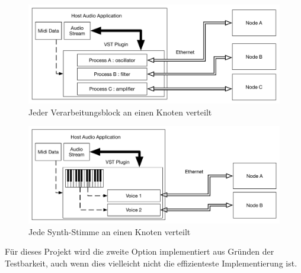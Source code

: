 \begin{figure}[H]
    \centering
    \includegraphics[width=\textwidth]{assets/distribution_perprocessor.pdf}
    \caption{Jeder Verarbeitungsblock an einen Knoten verteilt}
    \label{fig:perproccessor}
\end{figure}

\begin{figure}[H]
    \centering
    \includegraphics[width=\textwidth]{assets/distribute_byvoice.pdf}
    \caption{Jede Synth-Stimme an einen Knoten verteilt}
    \label{fig:pervoice}
\end{figure}

Für dieses Projekt wird die zweite Option implementiert aus  Gründen der Testbarkeit, auch wenn dies vielleicht nicht die effizienteste Implementierung ist.